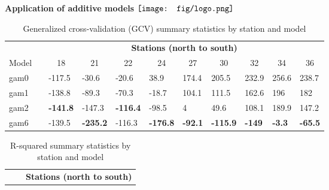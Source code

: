 \documentclass{beamer}
\begin{document}
\begin{frame}{\textbf{Application of additive models} \hspace{0pt plus 1 filll} $\vcenter{\hbox{\texttt{[image: fig/logo.png]}}}$}

\begin{table}[!tbp]
{\tiny
\caption{Generalized cross-validation (GCV) summary statistics by station and model\label{totab}} 
\begin{center}
\begin{tabular}{lclllllllll}
\hline\hline
\multicolumn{1}{c}{\bfseries }&\multicolumn{1}{c}{\bfseries }&\multicolumn{9}{c}{\bfseries Stations (north to south)}\tabularnewline
\cline{3-11}
\multicolumn{1}{c}{Model}&\multicolumn{1}{c}{}&\multicolumn{1}{c}{18}&\multicolumn{1}{c}{21}&\multicolumn{1}{c}{22}&\multicolumn{1}{c}{24}&\multicolumn{1}{c}{27}&\multicolumn{1}{c}{30}&\multicolumn{1}{c}{32}&\multicolumn{1}{c}{34}&\multicolumn{1}{c}{36}\tabularnewline
\hline
gam0&&-117.5&-30.6&-20.6&38.9&174.4&205.5&232.9&256.6&238.7\tabularnewline
gam1&&-138.8&-89.3&-70.3&-18.7&104.1&111.5&162.6&196&182\tabularnewline
gam2&&\textbf{\color{mypal3} -141.8}&-147.3&\textbf{\color{mypal3} -116.4}&-98.5&4&49.6&108.1&189.9&147.2\tabularnewline
gam6&&-139.5&\textbf{\color{mypal3} -235.2}&-116.3&\textbf{\color{mypal3} -176.8}&\textbf{\color{mypal3} -92.1}&\textbf{\color{mypal3} -115.9}&\textbf{\color{mypal3} -149}&\textbf{\color{mypal3} -3.3}&\textbf{\color{mypal3} -65.5}\tabularnewline
\hline
\end{tabular}\end{center}}
\end{table}
\begin{table}[!tbp]
{\tiny
\caption{R-squared summary statistics by station and model\label{totab}} 
\begin{center}
\begin{tabular}{lclllllllll}
\hline\hline
\multicolumn{1}{c}{\bfseries }&\multicolumn{1}{c}{\bfseries }&\multicolumn{9}{c}{\bfseries Stations (north to south)}\tabularnewline
\cline{3-11}

\end{tabular}
\end{center}}
\end{table}
\end{frame}
\end{document}

